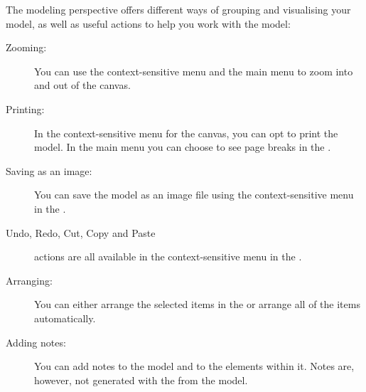 

The modeling perspective offers different ways of grouping and visualising your model, as well as useful actions to help you work with the model:

\begin{description}
\item [Zooming:]{You can use the context-sensitive menu and the main menu to zoom into and out of the canvas. }
\item [Printing:]{In the context-sensitive menu for the canvas, you can opt to print the model. In the main menu you can choose to see page breaks in the \gdmodeleditor{}. }
\item [Saving as an image:]{You can save the model as an image file using the context-sensitive menu in the \gdmodeleditor{}. }
\item [Undo, Redo, Cut, Copy and Paste]{ actions are all available in the context-sensitive menu in the \gdmodeleditor{}. }
\item [Arranging:]{You can either arrange the selected items in the \gdmodeleditor{} or arrange all of the items automatically.}
\item [Adding notes:]{You can add notes to the model and to the elements within it. Notes are, however, not generated with the \gdcases{} from the model.}
\end{description}


